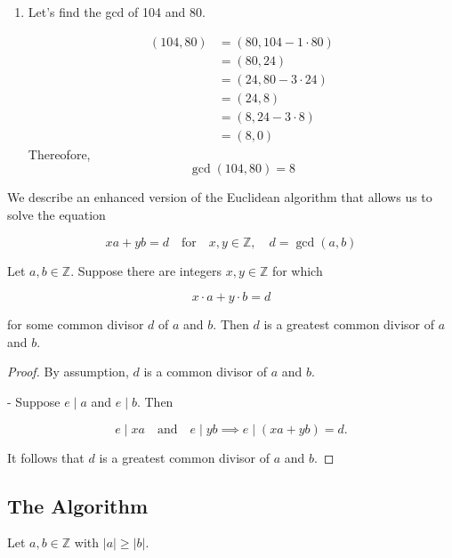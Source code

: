\documentclass[11pt]{article}
\begin{document}
\begin{enumerate}
    \item Let's find the gcd of 104 and 80.

          \begin{align*}
              (104, 80) & = (80, 104 - 1 \cdot 80) \\
                        & = (80, 24)               \\
                        & = (24, 80 - 3 \cdot 24)  \\
                        & = (24, 8)                \\
                        & = (8, 24 - 3 \cdot 8)    \\
                        & = (8, 0)
          \end{align*}
          Thereofore,
          \[
              \gcd(104,80) = 8
          \]
\end{enumerate}

We describe an enhanced version of the Euclidean algorithm that allows us to
solve the equation

\[
    x a + y b = d \quad \text{for} \quad x, y \in \mathbb{Z}, \quad d = \operatorname{gcd}(a, b)
\]

\begin{proposition} Let \(a, b \in \mathbb{Z}\). Suppose there are integers \(x, y \in \mathbb{Z}\) for which

    \[
        x \cdot a + y \cdot b = d
    \]

    for some common divisor \(d\) of \(a\) and \(b\). Then \(d\) is a greatest
    common divisor of \(a\) and \(b\).
\end{proposition}
\begin{proof} By assumption, \(d\) is a common divisor of \(a\) and \(b\).

    - Suppose \(e \mid a\) and \(e \mid b\). Then

    \[
        e \mid xa \quad \text{and} \quad e \mid yb \implies e \mid (xa + yb) = d.
    \]

    It follows that \(d\) is a greatest common divisor of \(a\) and \(b\).

\end{proof}
\subsection{The Algorithm}

Let \(a, b \in \mathbb{Z}\) with \(|a| \geq |b|\).
\end{document}
